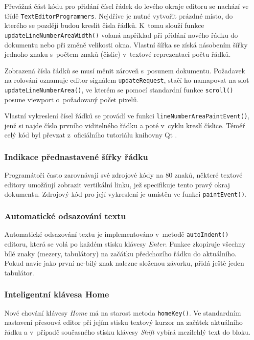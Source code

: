 \documentclass[11pt,twoside,a4paper]{book}
\begin{document}
Převážná část kódu pro přidání čísel řádek do levého okraje editoru se nachází ve třídě \texttt{TextEditorProgrammers}. Nejdříve je nutné vytvořit prázdné místo, do kterého se později budou kreslit čísla řádků. K~tomu slouží funkce \texttt{updateLineNumberAreaWidth()} volaná například při přidání nového řádku do dokumentu nebo při změně velikosti okna. Vlastní šířka se získá násobením šířky jednoho znaku s~počtem znaků (číslic) v~textové reprezentaci počtu řádků.

Zobrazená čísla řádků se musí měnit zároveň s~posunem dokumentu. Požadavek na rolování oznamuje editor signálem \texttt{updateRequest}, stačí ho namapovat na slot \texttt{up\-da\-te\-Li\-ne\-Num\-ber\-A\-re\-a()}, ve kterém se pomocí standardní funkce \texttt{scroll()} posune viewport o~požadovaný počet pixelů.

Vlastní vykreslení čísel řádků se provádí ve funkci \texttt{lineNumberAreaPaintEvent()}, jenž si najde číslo prvního viditelného řádku a poté v~cyklu kreslí číslice. Téměř celý kód byl převzat z~oficiálního tutoriálu knihovny Qt \cite{code_editor_example}.


\subsubsection{Indikace přednastavené šířky řádku}

Programátoři často zarovnávají své zdrojové kódy na 80 znaků, některé textové editory umožňují zobrazit vertikální linku, jež specifikuje tento pravý okraj dokumentu. Zdrojový kód pro její vykreslení je umístěn ve funkci \texttt{paintEvent()}.


\subsubsection{Automatické odsazování textu}

Automatické odsazování textu je implementováno v~metodě \texttt{autoIndent()} editoru, která se volá po každém stisku klávesy \textit{Enter}. Funkce zkopíruje všechny bílé znaky (mezery, tabulátory) na začátku předchozího řádku do aktuálního. Pokud navíc jako první ne-bílý znak nalezne složenou závorku, přidá ještě jeden tabulátor.


\subsubsection{Inteligentní klávesa Home}

Nové chování klávesy \textit{Home} má na starost metoda \texttt{homeKey()}. Ve standardním nastavení přesouvá editor při jejím stisku textový kurzor na začátek aktuálního řádku a v~případě současného stisku klávesy \textit{Shift} vybírá mezilehlý text do bloku.
\end{document}
